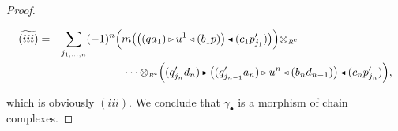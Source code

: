 \documentclass[reqno, a4paper, 10pt]{amsart}
\numberwithin{equation}{section}
\theoremstyle{plain}
\theoremstyle{definition}
\theoremstyle{remark}
\begin{document}
\begin{proof}
\begin{footnotesize}
\begin{eqnarray*}
\widetilde{(iii)} &=&  \sum_{j_{1, \ldots,n}} (-1)^n \Big( m{\big( {{\big( {(qa_1){{\,\raise1pt\hbox{$\scriptscriptstyle{\rhd}$} \, }} u^1{{\,\raise1pt\hbox{$\scriptscriptstyle{\lhd}$} \, }}(b_1p)} \big)}{{\,\raise1pt\hbox{$\scriptscriptstyle{\blacktriangleleft}$} \, }} (c_1p_{j_1}') } \big)}\Big){\otimes_{\scriptscriptstyle{{\scriptscriptstyle{{R^{\rm e}}}}}}}\hspace{3cm} \\ & & \hspace{2cm} \cdots {\otimes_{\scriptscriptstyle{{\scriptscriptstyle{{R^{\rm e}}}}}}} \Big((q_{j_n}'d_n) {{\,\raise1pt\hbox{$\scriptscriptstyle{\blacktriangleright}$} \, }} {\big( {(q_{j_{n-1}}'a_n){{\,\raise1pt\hbox{$\scriptscriptstyle{\rhd}$} \, }} u^{n}{{\,\raise1pt\hbox{$\scriptscriptstyle{\lhd}$} \, }}(b_nd_{n-1})} \big)}{{\,\raise1pt\hbox{$\scriptscriptstyle{\blacktriangleleft}$} \, }} (c_np_{j_n}')\Big),
\end{eqnarray*}
\end{footnotesize}
which is obviously $(iii)$. We conclude that $\gamma_{{\scriptscriptstyle{\bullet}}}$ is a morphism of chain complexes. 
\end{proof}
\end{document}
